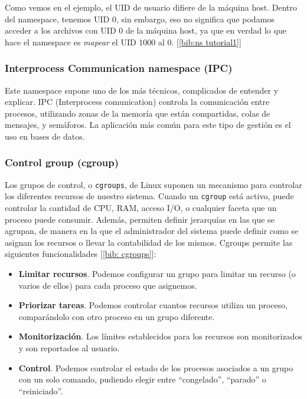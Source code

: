 \documentclass[12pt]{article}
\begin{document}
	\addvspace{20px}
	
	\par \noindent Como vemos en el ejemplo, el UID de usuario difiere de la máquina host. Dentro del namespace, tenemos UID 0, sin embargo, eso no significa que podamos acceder a los archivos con UID 0 de la máquina host, ya que en verdad lo que hace el namespace es \textit{mapear} el UID 1000 al 0. [\ref{bib:ns tutorial1}]
	
	
	\subsubsection{Interprocess Communication namespace (IPC)}
	\par \noindent Este namespace supone uno de los más técnicos, complicados de entender y explicar. IPC (Interprocess comunication) controla la comunicación entre procesos, utilizando zonas de la memoría que están compartidas, colas de mensajes, y semáforos. La aplicación más común para este tipo de gestión es el uso en bases de datos.
	
	\pagebreak
	
	\subsubsection{Control group (cgroup)}
	\par \noindent Los grupos de control, o \texttt{cgroups}, de Linux suponen un mecanismo para controlar los diferentes recursos de nuestro sistema. Cuando un \texttt{cgroup} está activo, puede controlar la cantidad de CPU, RAM, acceso I/O, o cualquier faceta que un proceso puede consumir. Además, permiten definir jerarquías en las que se agrupan, de manera en la que el administrador del sistema puede definir como se asignan los recursos o llevar la contabilidad de los mismos. Cgroups permite las siguientes funcionalidades [\ref{bib: cgroups}]: 
	\begin{itemize}
		\item \textbf{Limitar recursos}. Podemos configurar un grupo para limitar un recurso (o varios de ellos) para cada proceso que asignemos.
		\item \textbf{Priorizar tareas}. Podemos controlar cuantos recursos utiliza un proceso, comparándolo con otro proceso en un grupo diferente.
		\item \textbf{Monitorización}. Los límites establecidos para los recursos son monitorizados y son reportados al usuario.
		\item \textbf{Control}. Podemos controlar el estado de los procesos asociados a un grupo con un solo comando, pudiendo elegir entre ``congelado'', ``parado'' o ``reiniciado''.
	\end{itemize}
	
\end{document}
